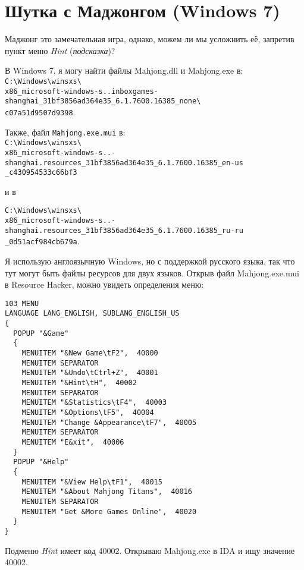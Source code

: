﻿\section{Шутка с Маджонгом (Windows 7)}

Маджонг это замечательная игра, однако, можем ли мы усложнить её, запретив пункт меню \emph{Hint} (\emph{подсказка})?

В Windows 7, я могу найти файлы Mahjong.dll и Mahjong.exe в:\\
\verb|C:\Windows\winsxs\| \\
\verb|x86_microsoft-windows-s..inboxgames-shanghai_31bf3856ad364e35_6.1.7600.16385_none\| \\
\verb|c07a51d9507d9398|.

Также, файл \verb|Mahjong.exe.mui| в:\\
\verb|C:\Windows\winsxs\| \\
\verb|x86_microsoft-windows-s..-shanghai.resources_31bf3856ad364e35_6.1.7600.16385_en-us| \\
\verb|_c430954533c66bf3|

и в

\verb|C:\Windows\winsxs\| \\
\verb|x86_microsoft-windows-s..-shanghai.resources_31bf3856ad364e35_6.1.7600.16385_ru-ru| \\
\verb|_0d51acf984cb679a|.

Я использую англоязычную Windows, но с поддержкой русского языка, так что тут могут быть файлы ресурсов для двух языков.
Открыв файл Mahjong.exe.mui в Resource Hacker, можно увидеть определения меню:

\begin{lstlisting}[caption=Ресурсы меню в Mahjong.exe.mui]
103 MENU
LANGUAGE LANG_ENGLISH, SUBLANG_ENGLISH_US
{
  POPUP "&Game"
  {
    MENUITEM "&New Game\tF2",  40000
    MENUITEM SEPARATOR
    MENUITEM "&Undo\tCtrl+Z",  40001
    MENUITEM "&Hint\tH",  40002
    MENUITEM SEPARATOR
    MENUITEM "&Statistics\tF4",  40003
    MENUITEM "&Options\tF5",  40004
    MENUITEM "Change &Appearance\tF7",  40005
    MENUITEM SEPARATOR
    MENUITEM "E&xit",  40006
  }
  POPUP "&Help"
  {
    MENUITEM "&View Help\tF1",  40015
    MENUITEM "&About Mahjong Titans",  40016
    MENUITEM SEPARATOR
    MENUITEM "Get &More Games Online",  40020
  }
}
\end{lstlisting}

Подменю \emph{Hint} имеет код 40002.
Открываю Mahjong.exe в IDA и ищу значение 40002.

